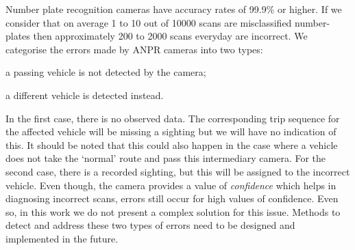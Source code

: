 Number plate recognition cameras have accuracy rates of 99.9\% or higher. If we consider that on average 1 to 10 out of 10000 scans are misclassified number-plates then approximately 200 to 2000 scans everyday are incorrect. We categorise the errors made by ANPR cameras into two types:
\begin{enumerate*}[label=(\roman*)]
  \item a passing vehicle is not detected by the camera;
  \item a different vehicle is detected instead.
\end{enumerate*}
In the first case, there is no observed data. The corresponding trip sequence for the affected vehicle will be missing a sighting but we will have no indication of this. It should be noted that this could also happen in the case where a vehicle does not take the `normal' route and pass this intermediary camera. For the second case, there is a recorded sighting, but this will be assigned to the incorrect vehicle. Even though, the camera provides a value of \emph{confidence} which helps in diagnosing incorrect scans, errors still occur for high values of confidence. Even so, in this work we do not present a complex solution for this issue. Methods to detect and address these two types of errors need to be designed and implemented in the future.

